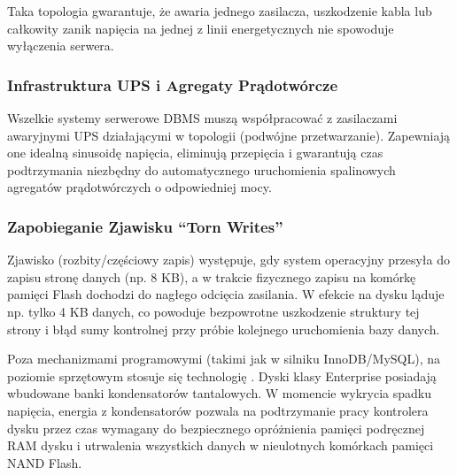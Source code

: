 \documentclass[a4paper,11pt,english,openany,oneside]{sphinxmanual}
\begin{document}
\sphinxAtStartPar
Taka topologia gwarantuje, że awaria jednego zasilacza, uszkodzenie kabla lub całkowity zanik napięcia na jednej z linii energetycznych nie spowoduje wyłączenia serwera.


\subsubsection{Infrastruktura UPS i Agregaty Prądotwórcze}
\label{\detokenize{rozdzial_2/rozdzial_21/index:infrastruktura-ups-i-agregaty-pradotworcze}}
\sphinxAtStartPar
Wszelkie systemy serwerowe DBMS muszą współpracować z zasilaczami awaryjnymi UPS działającymi w topologii  (podwójne przetwarzanie). Zapewniają one idealną sinusoidę napięcia, eliminują przepięcia i gwarantują czas podtrzymania niezbędny do automatycznego uruchomienia spalinowych agregatów prądotwórczych o odpowiedniej mocy.


\subsubsection{Zapobieganie Zjawisku “Torn Writes”}
\label{\detokenize{rozdzial_2/rozdzial_21/index:zapobieganie-zjawisku-torn-writes}}
\sphinxAtStartPar
Zjawisko  (rozbity/częściowy zapis) występuje, gdy system operacyjny przesyła do zapisu stronę danych (np. 8 KB), a w trakcie fizycznego zapisu na komórkę pamięci Flash dochodzi do nagłego odcięcia zasilania. W efekcie na dysku ląduje np. tylko 4 KB danych, co powoduje bezpowrotne uszkodzenie struktury tej strony i błąd sumy kontrolnej przy próbie kolejnego uruchomienia bazy danych.

\sphinxAtStartPar
Poza mechanizmami programowymi (takimi jak  w silniku InnoDB/MySQL), na poziomie sprzętowym stosuje się technologię . Dyski klasy Enterprise posiadają wbudowane banki kondensatorów tantalowych. W momencie wykrycia spadku napięcia, energia z kondensatorów pozwala na podtrzymanie pracy kontrolera dysku przez czas wymagany do bezpiecznego opróżnienia pamięci podręcznej RAM dysku i utrwalenia wszystkich danych w nieulotnych komórkach pamięci NAND Flash.
\end{document}

